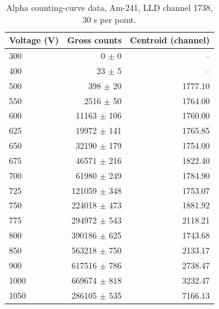 \begin{table}[htbp]
\centering
\caption{Alpha counting-curve data, Am-241, LLD channel 1738, 30 s per point.}
\label{tab:alpha-raw}
\begin{tabular}{lrr}
\toprule
Voltage (V) & Gross counts & Centroid (channel) \\
\midrule
300 & 0 $\pm$ 0 & -- \\
400 & 23 $\pm$ 5 & -- \\
500 & 398 $\pm$ 20 & 1777.10 \\
550 & 2516 $\pm$ 50 & 1764.00 \\
600 & 11163 $\pm$ 106 & 1760.00 \\
625 & 19972 $\pm$ 141 & 1765.85 \\
650 & 32190 $\pm$ 179 & 1754.00 \\
675 & 46571 $\pm$ 216 & 1822.40 \\
700 & 61980 $\pm$ 249 & 1784.90 \\
725 & 121059 $\pm$ 348 & 1753.07 \\
750 & 224018 $\pm$ 473 & 1881.92 \\
775 & 294972 $\pm$ 543 & 2118.21 \\
800 & 390186 $\pm$ 625 & 1743.68 \\
850 & 563218 $\pm$ 750 & 2133.17 \\
900 & 617516 $\pm$ 786 & 2738.47 \\
1000 & 669674 $\pm$ 818 & 3232.47 \\
1050 & 286105 $\pm$ 535 & 7166.13 \\
\bottomrule
\end{tabular}
\end{table}
